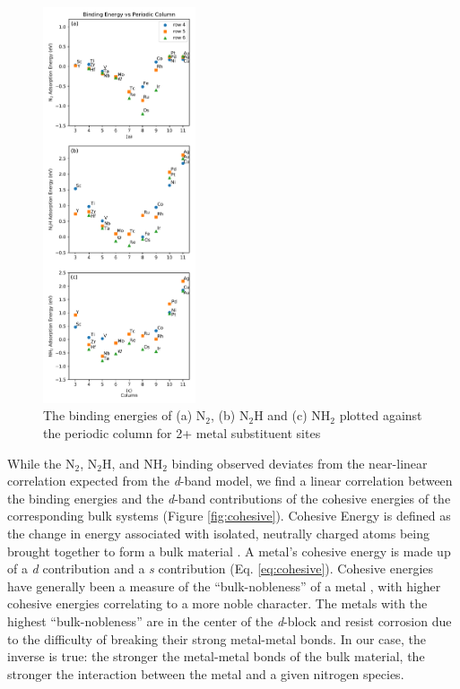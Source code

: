 \begin{figure}
    \centering
    \includegraphics[width=0.4\textwidth]{Images/adsorption_rows.pdf}
    \caption{The binding energies of (a) N$_2$, (b) N$_2$H and (c) NH$_2$ plotted against the periodic column for 2+ metal substituent sites}
    \label{fig:column_trends}
\end{figure}

While the N$_2$, N$_2$H, and NH$_2$ binding observed deviates from the near-linear correlation expected from the \textit{d}-band model, we find a linear correlation between the binding energies and the \textit{d}-band contributions of the cohesive energies of the corresponding bulk systems (Figure \ref{fig:cohesive}). Cohesive Energy is defined as the change in energy associated with isolated, neutrally charged atoms being brought together to form a bulk material \cite{Laughlin_2014}. A metal's cohesive energy is made up of a \textit{d} contribution and a \textit{s} contribution (Eq. \ref{eq:cohesive}). Cohesive energies have generally been a measure of the ``bulk-nobleness'' of a metal \cite{Hammer_1995}, with higher cohesive energies correlating to a more noble character. The metals with the highest ``bulk-nobleness'' are in the center of the \textit{d}-block and resist corrosion due to the difficulty of breaking their strong metal-metal bonds. In our case, the inverse is true: the stronger the metal-metal bonds of the bulk material, the stronger the interaction between the metal and a given nitrogen species.

